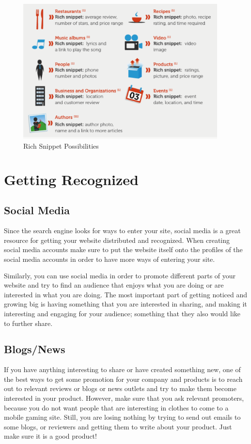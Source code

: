 \documentclass{article}
\begin{document}
\begin{figure}[h]
\centering
\includegraphics[width=400px]{images/snippet2.png}
\caption{Rich Snippet Possibilities}
\end{figure}

\section{Getting Recognized}
\subsection{Social Media}
Since the search engine looks for ways to enter your site, social media is a great resource for getting your website distributed and recognized. When creating social media accounts make sure to put the website itself onto the profiles of the social media accounts in order to have more ways of entering your site. 

Similarly, you can use social media in order to promote different parts of your website and try to find an audience that enjoys what you are doing or are interested in what you are doing. The most important part of getting noticed and growing big is having something that you are interested in sharing, and making it interesting and engaging for your audience; something that they also would like to further share.

\subsection{Blogs/News}
If you have anything interesting to share or have created something new, one of the best ways to get some promotion for your company and products is to reach out to relevant reviews or blogs or news outlets and try to make them become interested in your product. However, make sure that you ask relevant promoters, because you do not want people that are interesting in clothes to come to a mobile gaming site. Still, you are losing nothing by trying to send out emails to some blogs, or reviewers and getting them to write about your product. Just make sure it is a good product!
\end{document}
